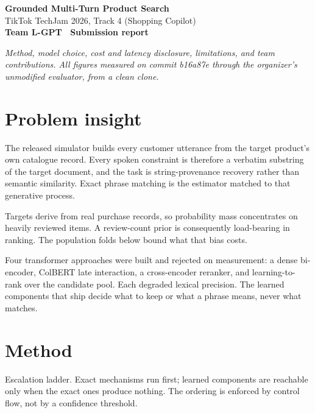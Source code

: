 \documentclass[11pt,a4paper]{article}
\newcommand{\lead}[1]{{\itshape\color{muted}#1}\par}
\newcommand{\code}[1]{{\ttfamily\small #1}}
\begin{document}
\begin{flushleft}
{\sffamily\bfseries\LARGE Grounded Multi-Turn Product Search}\\[3pt]
{\sffamily\color{muted} TikTok TechJam 2026, Track 4 (Shopping Copilot)}\\[3pt]
{\sffamily\bfseries\color{accent} Team L-GPT \textperiodcentered\ Submission report}
\end{flushleft}
\vspace{-6pt}{\color{rule}\rule{\textwidth}{0.5pt}}\vspace{-2pt}
\lead{Method, model choice, cost and latency disclosure, limitations, and team contributions. All figures measured on commit \code{b16a87e} through the organizer's unmodified evaluator, from a clean clone.}
\section{Problem insight}
The released simulator builds every customer utterance from the target product's own catalogue record. Every spoken constraint is therefore a verbatim substring of the target document, and the task is string-provenance recovery rather than semantic similarity. Exact phrase matching is the estimator matched to that generative process.

Targets derive from real purchase records, so probability mass concentrates on heavily reviewed items. A review-count prior is consequently load-bearing in ranking. The population folds below bound what that bias costs.

Four transformer approaches were built and rejected on measurement: a dense bi-encoder, ColBERT late interaction, a cross-encoder reranker, and learning-to-rank over the candidate pool. Each degraded lexical precision. The learned components that ship decide what to keep or what a phrase means, never what matches.

\section{Method}
Escalation ladder. Exact mechanisms run first; learned components are reachable only when the exact ones produce nothing. The ordering is enforced by control flow, not by a confidence threshold.
\end{document}
